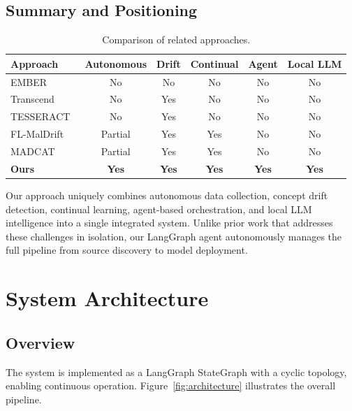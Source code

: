 \documentclass[12pt,a4paper]{article}
\begin{document}
\subsection{Summary and Positioning}

\begin{table}[H]
\centering
\caption{Comparison of related approaches.}
\label{tab:related_comparison}
\begin{tabular}{lccccc}
\toprule
\textbf{Approach} & \textbf{Autonomous} & \textbf{Drift} & \textbf{Continual} & \textbf{Agent} & \textbf{Local LLM} \\
\midrule
EMBER~\cite{anderson2018ember} & No & No & No & No & No \\
Transcend~\cite{jordaney2017transcend} & No & Yes & No & No & No \\
TESSERACT~\cite{pendlebury2019tesseract} & No & Yes & No & No & No \\
FL-MalDrift~\cite{flmaldrift2025} & Partial & Yes & Yes & No & No \\
MADCAT~\cite{xu2024madcat} & Partial & Yes & Yes & No & No \\
\textbf{Ours} & \textbf{Yes} & \textbf{Yes} & \textbf{Yes} & \textbf{Yes} & \textbf{Yes} \\
\bottomrule
\end{tabular}
\end{table}

Our approach uniquely combines autonomous data collection, concept drift detection, continual learning, agent-based orchestration, and local LLM intelligence into a single integrated system. Unlike prior work that addresses these challenges in isolation, our LangGraph agent autonomously manages the full pipeline from source discovery to model deployment.

\section{System Architecture}
\label{sec:architecture}

\subsection{Overview}

The system is implemented as a LangGraph StateGraph with a cyclic topology, enabling continuous operation. Figure~\ref{fig:architecture} illustrates the overall pipeline.
\end{document}
